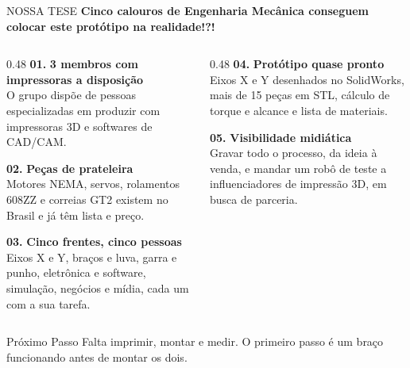 \documentclass[aspectratio=169, 10pt]{beamer}
\newcommand{\currentpresenter}{Rodrigo}
\newcommand{\setpresenter}[1]{\renewcommand{\currentpresenter}{#1}}
\begin{document}
	\setpresenter{Júlio}
	\begin{frame}{NOSSA TESE}
		\textbf{\large Cinco calouros de Engenharia Mecânica conseguem colocar este protótipo na realidade!?!}
		\vspace{0.15cm}
		
		\begin{columns}[T]
			\begin{column}{0.48\textwidth}
				\scriptsize
				\textbf{\color{FlexoOrange}01.} \textbf{3 membros com impressoras a disposição}\\
				O grupo dispõe de pessoas especializadas em produzir com impressoras 3D e softwares de CAD/CAM.
				\vspace{0.2cm}
				
				\textbf{\color{FlexoOrange}02.} \textbf{Peças de prateleira}\\
				Motores NEMA, servos, rolamentos 608ZZ e correias GT2 existem no Brasil e já têm lista e preço.
				\vspace{0.2cm}
				
				\textbf{\color{FlexoOrange}03.} \textbf{Cinco frentes, cinco pessoas}\\
				Eixos X e Y, braços e luva, garra e punho, eletrônica e software, simulação, negócios e mídia, cada um com a sua tarefa.
			\end{column}
			
			\begin{column}{0.48\textwidth}
				\scriptsize
				\textbf{\color{FlexoOrange}04.} \textbf{Protótipo quase pronto}\\
				Eixos X e Y desenhados no SolidWorks, mais de 15 peças em STL, cálculo de torque e alcance e lista de materiais.
				\vspace{0.2cm}
				
				\textbf{\color{FlexoOrange}05.} \textbf{Visibilidade midiática}\\
				Gravar todo o processo, da ideia à venda, e mandar um robô de teste a influenciadores de impressão 3D, em busca de parceria.
			\end{column}
		\end{columns}
		
		\vspace{0.25cm}
		\begin{block}{Próximo Passo}
			\footnotesize Falta imprimir, montar e medir. O primeiro passo é um braço funcionando antes de montar os dois.
		\end{block}
	\end{frame}
	
\end{document}
